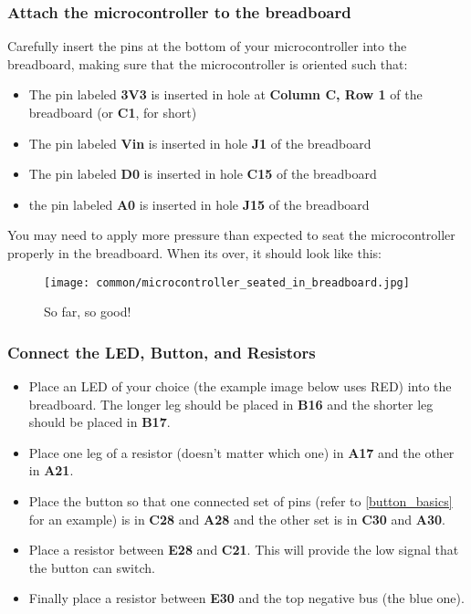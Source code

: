 \subsubsection{Attach the microcontroller to the breadboard}
Carefully insert the pins at the bottom of your microcontroller into the breadboard, making sure that the microcontroller is oriented such that:
\begin{itemize}
    \item The pin labeled \textbf{3V3} is inserted in hole at \textbf{Column C, Row 1} of the breadboard (or \textbf{C1}, for short)
    \item The pin labeled \textbf{Vin} is inserted in hole \textbf{J1} of the breadboard
    \item The pin labeled \textbf{D0} is inserted in hole \textbf{C15} of the breadboard
    \item the pin labeled \textbf{A0} is inserted in hole \textbf{J15} of the breadboard
\end{itemize}
You may need to apply more pressure than expected to seat the microcontroller properly in the breadboard. When its over, it should look like this:

\begin{figure}[H]
    \centering
    \texttt{[image: common/microcontroller\_seated\_in\_breadboard.jpg]}
    \caption{So far, so good!}
\end{figure}

\subsubsection{Connect the LED, Button, and Resistors}
\begin{itemize}
    \item Place an LED of your choice (the example image below uses RED) into the breadboard. The longer leg
    should be placed in \textbf{B16} and the shorter leg should be placed in \textbf{B17}.
    \item Place one leg of a resistor (doesn't matter which one) in \textbf{A17} and the other in
    \textbf{A21}.
    \item Place the button so that one connected set of pins (refer to \ref{button_basics} for an
    example) is in \textbf{C28} and \textbf{A28} and the other set is in \textbf{C30} and \textbf{A30}.
    \item Place a resistor between \textbf{E28} and \textbf{C21}. This will provide the low signal that
    the button can switch.
    \item Finally place a resistor between \textbf{E30} and the top negative bus (the blue one).
\end{itemize}

